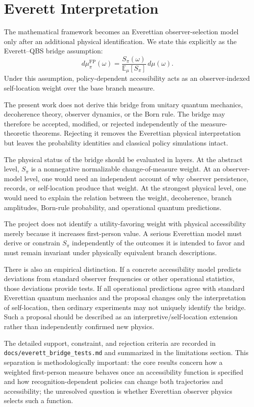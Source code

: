 \section{Everett Interpretation}

The mathematical framework becomes an Everettian observer-selection model only after an additional physical identification. We state this explicitly as the Everett--QBS bridge assumption:
\[
d\mu^{\mathrm{FP}}_\pi(\omega)
=
\frac{S_\pi(\omega)}{\mathbb E_\mu[S_\pi]}
\,d\mu(\omega).
\]
Under this assumption, policy-dependent accessibility acts as an observer-indexed self-location weight over the base branch measure.

The present work does not derive this bridge from unitary quantum mechanics, decoherence theory, observer dynamics, or the Born rule. The bridge may therefore be accepted, modified, or rejected independently of the measure-theoretic theorems. Rejecting it removes the Everettian physical interpretation but leaves the probability identities and classical policy simulations intact.

The physical status of the bridge should be evaluated in layers. At the abstract level, $S_\pi$ is a nonnegative normalizable change-of-measure weight. At an observer-model level, one would need an independent account of why observer persistence, records, or self-location produce that weight. At the strongest physical level, one would need to explain the relation between the weight, decoherence, branch amplitudes, Born-rule probability, and operational quantum predictions.

The project does not identify a utility-favoring weight with physical accessibility merely because it increases first-person value. A serious Everettian model must derive or constrain $S_\pi$ independently of the outcomes it is intended to favor and must remain invariant under physically equivalent branch descriptions.

There is also an empirical distinction. If a concrete accessibility model predicts deviations from standard observer frequencies or other operational statistics, those deviations provide tests. If all operational predictions agree with standard Everettian quantum mechanics and the proposal changes only the interpretation of self-location, then ordinary experiments may not uniquely identify the bridge. Such a proposal should be described as an interpretive/self-location extension rather than independently confirmed new physics.

The detailed support, constraint, and rejection criteria are recorded in \texttt{docs/everett\_bridge\_tests.md} and summarized in the limitations section. This separation is methodologically important: the core results concern how a weighted first-person measure behaves once an accessibility function is specified and how recognition-dependent policies can change both trajectories and accessibility; the unresolved question is whether Everettian observer physics selects such a function.
